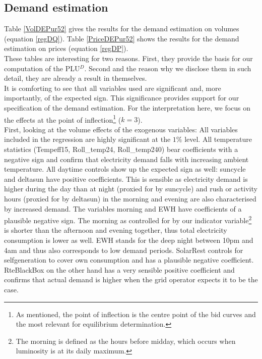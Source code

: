 \subsection{Demand estimation}
Table \ref{VolDEPur52} gives the results for the demand estimation on volumes (equation \ref{regDQ}). Table \ref{PriceDEPur52} shows the results for the demand estimation on prices (equation \ref{regDP}). \\

These tables are interesting for two reasons. First, they provide the basis for our computation of the PLU$^D$. Second and the reason why we disclose them in such detail, they are already a result in themselves. \\

It is comforting to see that all variables used are significant and, more importantly, of the expected sign. This significance provides  support for our specification of the demand estimation. 
For the interpretation here, we focus on the effects at the point of inflection\footnote{As mentioned, the point of inflection is the centre point of the bid curves and the most relevant for equilibrium determination. %
} ($k=3$). \\

First, looking at the volume effects of the exogenous variables: 
All variables included in the regression are highly significant at the $1\%$ level.
All temperature statistics (Tempeff15, Roll\_temp24, Roll\_temp240) bear coefficients with a negative sign and confirm that electricity demand falls with increasing ambient temperature.  All daytime controls show up the expected sign as well: suncycle and deltasun have positive coefficients. This is sensible as electricity demand is higher during the day than at night (proxied for by suncycle) and rush or activity hours (proxied for by deltasun) in the morning and evening are also characterised by increased demand. The variables morning and EWH have coefficients of a plausible negative sign. The morning as controlled for by our indicator variable\footnote{The morning is defined as the hours before midday, which occurs when luminosity is at its daily maximum.} is shorter than the afternoon and evening together, thus total electricity consumption is lower as well. EWH stands for the deep night between 10pm and 4am and thus also corresponds to low demand periods. SolarRest controls for selfgeneration to cover own consumption and has a plausible negative coefficient. RteBlackBox on the other hand has a very sensible positive coefficient and confirms that actual demand is higher when the grid operator expects it to be the case. \\

